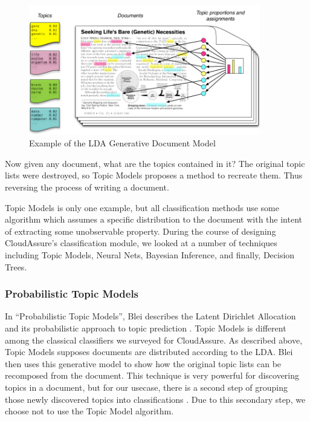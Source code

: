 \begin{figure}[h!]
    \begin{center}
        \includegraphics[width=0.90\textwidth]{Figures/LDA_Generation.png}
        \caption{Example of the LDA Generative Document Model}
        \label{fig:LDA_Generative_Model}
    \end{center}
\end{figure}
Now given any document, what are the topics contained in it? The original topic
lists were destroyed, so Topic Models proposes a method to recreate them. Thus reversing
the process of writing a document.

Topic Models is only one example, but all classification methods use some algorithm which assumes a specific
distribution to the document with the intent of extracting some unobservable
property. During the course of designing CloudAssure's classification module, we looked at a number of techniques
including Topic Models, Neural Nets, Bayesian Inference, and finally, Decision Trees.

\subsubsection{Probabilistic Topic Models}
In ``Probabilistic Topic Models'', Blei describes the Latent Dirichlet
Allocation and its probabilistic approach to topic prediction
\autocite{Blei2012}. Topic Models is different among the classical classifiers we
surveyed for CloudAssure. As described above, Topic Models supposes documents are
distributed according to the \gls{LDA}. Blei then uses this generative model to 
show how the original topic lists can be
recomposed from the document. This technique is very powerful for discovering
topics in a document, but for our usecase, there is a second step of
grouping those newly discovered topics into classifications
\autocite{RadimRehurek2010}. Due to this secondary step, we
choose not to use the Topic Model algorithm.

